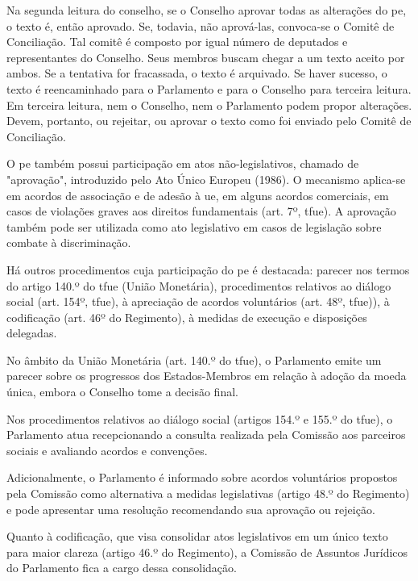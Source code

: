 Na segunda leitura do conselho, se o Conselho aprovar todas as alterações do \acrshort{pe}, o texto é, então aprovado. Se, todavia, não aprová-las, convoca-se o Comitê de Conciliação. Tal comitê é composto por igual número de deputados e representantes do Conselho. Seus membros buscam chegar a um texto aceito por ambos. Se a tentativa for fracassada, o texto é arquivado. Se haver sucesso, o texto é reencaminhado para o Parlamento e para o Conselho para terceira leitura. Em terceira leitura, nem o Conselho, nem o Parlamento podem propor alterações. Devem, portanto, ou rejeitar, ou aprovar o texto como foi enviado pelo Comitê de Conciliação.


O \acrshort{pe} também possui participação em atos não-legislativos, chamado de "aprovação", introduzido pelo Ato Único Europeu (1986). O mecanismo aplica-se em acordos de associação e de adesão à \acrshort{ue}, em alguns acordos comerciais, em casos de violações graves aos direitos fundamentais (art. 7º, \acrshort{tfue}). A aprovação também pode ser utilizada como ato legislativo em casos de legislação sobre combate à discriminação.

Há outros procedimentos cuja participação do \acrshort{pe} é destacada: parecer nos termos do artigo 140.º do \acrshort{tfue} (União Monetária), procedimentos relativos ao diálogo social (art. 154º, \acrshort{tfue}), à apreciação de acordos voluntários (art. 48º, \acrshort{tfue})), à codificação (art. 46º do Regimento), à medidas de execução e disposições delegadas.

No âmbito da União Monetária (art. 140.º do \acrshort{tfue}), o Parlamento emite um parecer sobre os progressos dos Estados-Membros em relação à adoção da moeda única, embora o Conselho tome a decisão final.

Nos procedimentos relativos ao diálogo social (artigos 154.º e 155.º do \acrshort{tfue}), o Parlamento atua recepcionando a consulta realizada pela Comissão aos parceiros sociais e avaliando acordos e convenções. 

Adicionalmente, o Parlamento é informado sobre acordos voluntários propostos pela Comissão como alternativa a medidas legislativas (artigo 48.º do Regimento) e pode apresentar uma resolução recomendando sua aprovação ou rejeição.

Quanto à codificação, que visa consolidar atos legislativos em um único texto para maior clareza (artigo 46.º do Regimento), a Comissão de Assuntos Jurídicos do Parlamento fica a cargo dessa consolidação.

